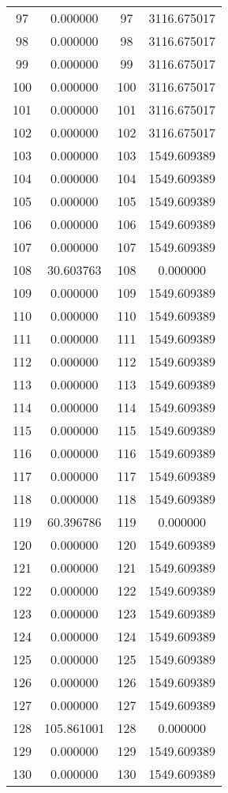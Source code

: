 \documentclass[12pt]{article}
\begin{document}
\begin{longtable}{@{}cccc@{}}
97 & 0.000000 & 97 & 3116.675017 \\
98 & 0.000000 & 98 & 3116.675017 \\
99 & 0.000000 & 99 & 3116.675017 \\
100 & 0.000000 & 100 & 3116.675017 \\
101 & 0.000000 & 101 & 3116.675017 \\
102 & 0.000000 & 102 & 3116.675017 \\
103 & 0.000000 & 103 & 1549.609389 \\
104 & 0.000000 & 104 & 1549.609389 \\
105 & 0.000000 & 105 & 1549.609389 \\
106 & 0.000000 & 106 & 1549.609389 \\
107 & 0.000000 & 107 & 1549.609389 \\
108 & 30.603763 & 108 & 0.000000 \\
109 & 0.000000 & 109 & 1549.609389 \\
110 & 0.000000 & 110 & 1549.609389 \\
111 & 0.000000 & 111 & 1549.609389 \\
112 & 0.000000 & 112 & 1549.609389 \\
113 & 0.000000 & 113 & 1549.609389 \\
114 & 0.000000 & 114 & 1549.609389 \\
115 & 0.000000 & 115 & 1549.609389 \\
116 & 0.000000 & 116 & 1549.609389 \\
117 & 0.000000 & 117 & 1549.609389 \\
118 & 0.000000 & 118 & 1549.609389 \\
119 & 60.396786 & 119 & 0.000000 \\
120 & 0.000000 & 120 & 1549.609389 \\
121 & 0.000000 & 121 & 1549.609389 \\
122 & 0.000000 & 122 & 1549.609389 \\
123 & 0.000000 & 123 & 1549.609389 \\
124 & 0.000000 & 124 & 1549.609389 \\
125 & 0.000000 & 125 & 1549.609389 \\
126 & 0.000000 & 126 & 1549.609389 \\
127 & 0.000000 & 127 & 1549.609389 \\
128 & 105.861001 & 128 & 0.000000 \\
129 & 0.000000 & 129 & 1549.609389 \\
130 & 0.000000 & 130 & 1549.609389 \\

\end{longtable}
\end{document}
